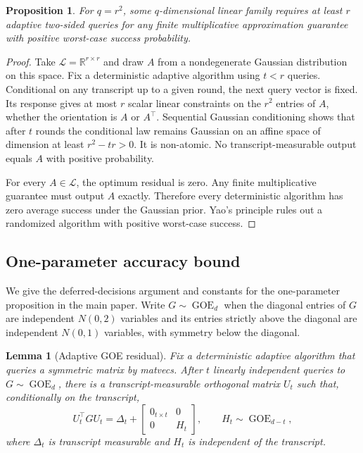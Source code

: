 \documentclass[twoside]{article}
\newtheorem{proposition}[theorem]{Proposition}
\newtheorem{lemma}[theorem]{Lemma}
\newcommand{\R}{\mathbb R}
\newcommand{\cL}{\mathcal L}
\begin{document}
\begin{proposition}
\label{prop:dimension-lower}
For $q=r^2$, some $q$-dimensional linear family requires at least $r$ adaptive
two-sided queries for any finite multiplicative approximation guarantee with
positive worst-case success probability.
\end{proposition}

\begin{proof}
Take $\cL=\R^{r\times r}$ and draw $A$ from a nondegenerate Gaussian
distribution on this space. Fix a deterministic adaptive algorithm using
$t<r$ queries. Conditional on any transcript up to a given round, the next
query vector is fixed. Its response gives at most $r$ scalar linear
constraints on the $r^2$ entries of $A$, whether the orientation is $A$ or
$A^\top$. Sequential Gaussian conditioning shows that after $t$ rounds the
conditional law remains Gaussian on an affine space of dimension at least
$r^2-tr>0$. It is non-atomic. No transcript-measurable output equals $A$ with
positive probability.

For every $A\in\cL$, the optimum residual is zero. Any finite multiplicative
guarantee must output $A$ exactly. Therefore every deterministic algorithm
has zero average success under the Gaussian prior. Yao's principle rules out
a randomized algorithm with positive worst-case success.
\end{proof}

\subsection{One-parameter accuracy bound}

We give the deferred-decisions argument and constants for the one-parameter
proposition in the main paper. Write
$G\sim\operatorname{GOE}_d$ when the diagonal entries of $G$ are independent
$N(0,2)$ variables and its entries strictly above the diagonal are
independent $N(0,1)$ variables, with symmetry below the diagonal.

\begin{lemma}[Adaptive GOE residual]
\label{lem:goe-residual}
Fix a deterministic adaptive algorithm that queries a symmetric matrix by
matvecs. After $t$ linearly independent queries to
$G\sim\operatorname{GOE}_d$, there is a transcript-measurable orthogonal
matrix $U_t$ such that, conditionally on the transcript,
\begin{equation}
 U_t^\top G U_t=\Delta_t+
 \begin{bmatrix}
  0_{t\times t}&0\\
  0&H_t
 \end{bmatrix},
 \qquad H_t\sim\operatorname{GOE}_{d-t},
 \label{eq:goe-residual}
\end{equation}
where $\Delta_t$ is transcript measurable and $H_t$ is independent of the
transcript.
\end{lemma}
\end{document}
